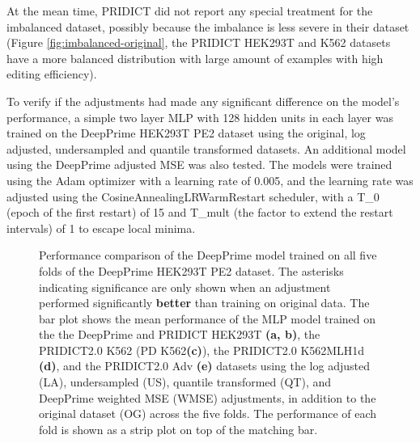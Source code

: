 At the mean time, PRIDICT did not report any special treatment for the imbalanced dataset, possibly because the imbalance is less severe in their dataset (Figure \ref{fig:imbalanced-original}, the PRIDICT HEK293T and K562 datasets have a more balanced distribution with large amount of examples with high editing efficiency). 

To verify if the adjustments had made any significant difference on the model's performance, a simple two layer MLP with 128 hidden units in each layer was trained on the DeepPrime HEK293T PE2 dataset using the original, log adjusted, undersampled and quantile transformed datasets. An additional model using the DeepPrime adjusted MSE was also tested. The models were trained using the Adam optimizer with a learning rate of 0.005, and the learning rate was adjusted using the CosineAnnealingLRWarmRestart scheduler, with a T\_0 (epoch of the first restart) of 15 and T\_mult (the factor to extend the restart intervals) of 1 to escape local minima. 

\begin{figure}
    \centering
    \vspace{-3mm} %
    \vspace{-3mm}
    \vspace{-3mm}
    \vspace{-3mm}
    \vspace{-3mm}
    \caption[DeepPrime model performance comparison after adjustments]{Performance comparison of the DeepPrime model trained on all five folds of the DeepPrime HEK293T PE2 dataset. The asterisks indicating significance are only shown when an adjustment performed significantly \textbf{better} than training on original data. The bar plot shows the mean performance of the MLP model trained on the the DeepPrime and PRIDICT HEK293T \textbf{(a, b)}, the PRIDICT2.0 K562 (PD K562\textbf{(c)}), the PRIDICT2.0 K562MLH1d \textbf{(d)}, and the PRIDICT2.0 Adv \textbf{(e)} datasets using the log adjusted (LA), undersampled (US), quantile transformed (QT), and DeepPrime weighted MSE (WMSE) adjustments, in addition to the original dataset (OG) across the five folds. The performance of each fold is shown as a strip plot on top of the matching bar.}
    \label{fig:adjustment-performance}
\end{figure}

